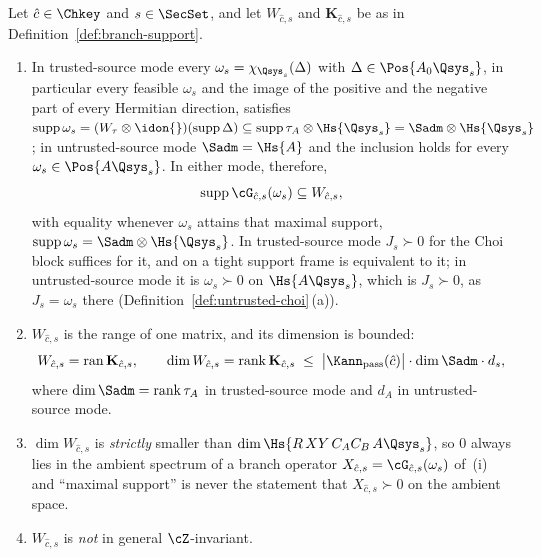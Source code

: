 \begin{lemma}\label{lem:branch-support}
Let $\hat c\in\Chkey$ and $s\in\SecSet$, and let $W_{\hat c,s}$ and
$\mathbf K_{\hat c,s}$ be as in Definition~\ref{def:branch-support}.
\begin{enumerate}[label=(\roman*),leftmargin=2.2em]
\item In trusted-source mode every $\omega_s=\chi_{\Qsys_s}(\Delta)$ with
  $\Delta\in\Pos{A_0\Qsys_s}$, in particular every feasible $\omega_s$
  and the image of the positive and the negative part of every Hermitian
  direction, satisfies
  $\operatorname{supp}\omega_s
  =(W_{\tau}\otimes\idon{})(\operatorname{supp}\Delta)
  \subseteq\operatorname{supp}\tau_A\otimes\Hs{\Qsys_s}
  =\Sadm\otimes\Hs{\Qsys_s}$; in untrusted-source mode
  $\Sadm=\Hs{A}$ and the inclusion holds for every
  $\omega_s\in\Pos{A\Qsys_s}$. In either mode, therefore,
  \begin{equation}\label{eq:Wcs-bound}
    \operatorname{supp}\cG_{\hat c,s}(\omega_s)\subseteq W_{\hat c,s},
  \end{equation}
  with equality whenever $\omega_s$ attains that maximal support,
  $\operatorname{supp}\omega_s=\Sadm\otimes\Hs{\Qsys_s}$. In
  trusted-source mode $J_s\succ0$ for the Choi block suffices for it, and
  on a tight support frame is equivalent to it; in untrusted-source mode it
  is $\omega_s\succ0$ on $\Hs{A\Qsys_s}$, which is $J_s\succ0$, as
  $J_s=\omega_s$ there (Definition~\ref{def:untrusted-choi}\,(a)).
\item $W_{\hat c,s}$ is the range of one matrix, and its dimension is
  bounded:
  \begin{equation}\label{eq:Kstack-rank}
    W_{\hat c,s}=\operatorname{ran}\mathbf K_{\hat c,s},
    \qquad
    \dim W_{\hat c,s}=\operatorname{rank}\mathbf K_{\hat c,s}
    \;\le\;\big|\Kann_{\mathrm{pass}}(\hat c)\big|\cdot
    \dim\Sadm\cdot d_s ,
  \end{equation}
  where $\dim\Sadm=\operatorname{rank}\tau_A$ in trusted-source mode and
  $d_A$ in untrusted-source mode.
\item $\dim W_{\hat c,s}$ is \emph{strictly} smaller than
  $\dim\Hs{R\,XY\,C_AC_B\,A\Qsys_s}$, so $0$ always lies in the ambient
  spectrum of a branch operator $X_{\hat c,s}=\cG_{\hat c,s}(\omega_s)$ of~(i)
  and ``maximal support'' is never the statement that $X_{\hat c,s}\succ0$
  on the ambient space.
\item $W_{\hat c,s}$ is \emph{not} in general $\cZ$-invariant.
\end{enumerate}
\end{lemma}


